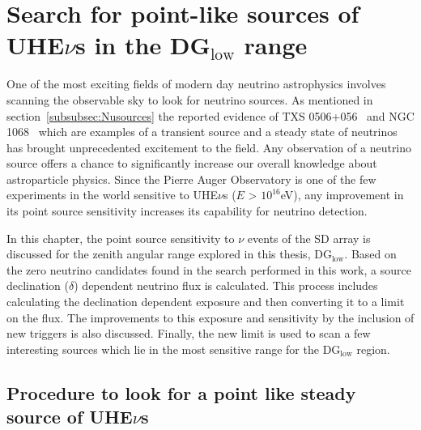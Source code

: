 
\chapter{Search for point-like sources of UHE\texorpdfstring{$\nu$}{}s in the DG\texorpdfstring{$_{\text{low}}$}{} range}
\label{chap:follow-up}

One of the most exciting fields of modern day neutrino astrophysics involves scanning the observable sky to look for neutrino sources. As mentioned in section~\ref{subsubsec:Nusources} the reported evidence of TXS 0506+056~\cite{Icecube_txs} and NGC 1068~\cite{Icecube_2022} which are examples of a transient source and a steady state of neutrinos has brought unprecedented excitement to the field. Any observation of a neutrino source offers a chance to significantly increase our overall knowledge about astroparticle physics. Since the Pierre Auger Observatory is one of the few experiments in the world sensitive to UHE$\nu$s ($E$ > $10^{16}$eV), any improvement in its point source sensitivity increases its capability for neutrino detection. 

In this chapter, the point source sensitivity to $\nu$ events of the SD array is discussed for the zenith angular range explored in this thesis, DG$_{\text{low}}$. Based on the zero neutrino candidates found in the search performed in this work, a source declination ($\delta$) dependent neutrino flux is calculated. This process includes calculating the declination dependent exposure and then converting it to a limit on the flux. The improvements to this exposure and sensitivity by the inclusion of new triggers is also discussed. Finally, the new limit is used to scan a few interesting sources which lie in the most sensitive range for the DG$_{\text{low}}$ region.

\section{Procedure to look for a point like steady source of UHE\texorpdfstring{$\nu$}{}s}
\label{sec:procedure_point_source}

